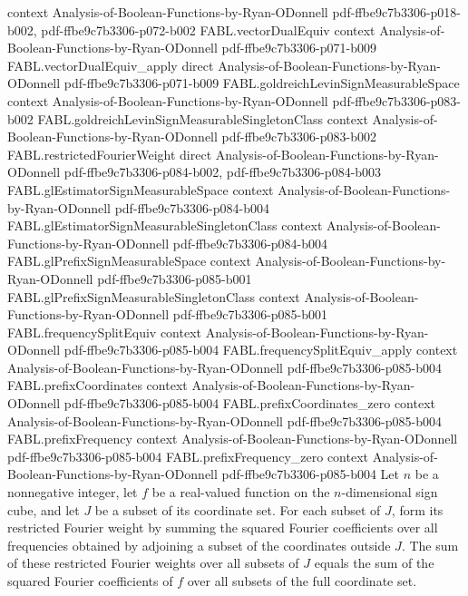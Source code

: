 \begin{theorem}
  {context}
  {Analysis-of-Boolean-Functions-by-Ryan-ODonnell}
  {pdf-ffbe9c7b3306-p018-b002,
    pdf-ffbe9c7b3306-p072-b002}
\proofstep
  {FABL.vectorDualEquiv}
  {context}
  {Analysis-of-Boolean-Functions-by-Ryan-ODonnell}
  {pdf-ffbe9c7b3306-p071-b009}
\proofstep
  {FABL.vectorDualEquiv_apply}
  {direct}
  {Analysis-of-Boolean-Functions-by-Ryan-ODonnell}
  {pdf-ffbe9c7b3306-p071-b009}
\proofstep
  {FABL.goldreichLevinSignMeasurableSpace}
  {context}
  {Analysis-of-Boolean-Functions-by-Ryan-ODonnell}
  {pdf-ffbe9c7b3306-p083-b002}
\proofstep
  {FABL.goldreichLevinSignMeasurableSingletonClass}
  {context}
  {Analysis-of-Boolean-Functions-by-Ryan-ODonnell}
  {pdf-ffbe9c7b3306-p083-b002}
\proofstep
  {FABL.restrictedFourierWeight}
  {direct}
  {Analysis-of-Boolean-Functions-by-Ryan-ODonnell}
  {pdf-ffbe9c7b3306-p084-b002,
    pdf-ffbe9c7b3306-p084-b003}
\proofstep
  {FABL.glEstimatorSignMeasurableSpace}
  {context}
  {Analysis-of-Boolean-Functions-by-Ryan-ODonnell}
  {pdf-ffbe9c7b3306-p084-b004}
\proofstep
  {FABL.glEstimatorSignMeasurableSingletonClass}
  {context}
  {Analysis-of-Boolean-Functions-by-Ryan-ODonnell}
  {pdf-ffbe9c7b3306-p084-b004}
\proofstep
  {FABL.glPrefixSignMeasurableSpace}
  {context}
  {Analysis-of-Boolean-Functions-by-Ryan-ODonnell}
  {pdf-ffbe9c7b3306-p085-b001}
\proofstep
  {FABL.glPrefixSignMeasurableSingletonClass}
  {context}
  {Analysis-of-Boolean-Functions-by-Ryan-ODonnell}
  {pdf-ffbe9c7b3306-p085-b001}
\proofstep
  {FABL.frequencySplitEquiv}
  {context}
  {Analysis-of-Boolean-Functions-by-Ryan-ODonnell}
  {pdf-ffbe9c7b3306-p085-b004}
\proofstep
  {FABL.frequencySplitEquiv_apply}
  {context}
  {Analysis-of-Boolean-Functions-by-Ryan-ODonnell}
  {pdf-ffbe9c7b3306-p085-b004}
\proofstep
  {FABL.prefixCoordinates}
  {context}
  {Analysis-of-Boolean-Functions-by-Ryan-ODonnell}
  {pdf-ffbe9c7b3306-p085-b004}
\proofstep
  {FABL.prefixCoordinates_zero}
  {context}
  {Analysis-of-Boolean-Functions-by-Ryan-ODonnell}
  {pdf-ffbe9c7b3306-p085-b004}
\proofstep
  {FABL.prefixFrequency}
  {context}
  {Analysis-of-Boolean-Functions-by-Ryan-ODonnell}
  {pdf-ffbe9c7b3306-p085-b004}
\proofstep
  {FABL.prefixFrequency_zero}
  {context}
  {Analysis-of-Boolean-Functions-by-Ryan-ODonnell}
  {pdf-ffbe9c7b3306-p085-b004}
Let $n$ be a nonnegative integer, let $f$ be a real-valued function on the
$n$-dimensional sign cube, and let $J$ be a subset of its coordinate set. For each
subset of $J$, form its restricted Fourier weight by summing the squared Fourier
coefficients over all frequencies obtained by adjoining a subset of the coordinates
outside $J$. The sum of these restricted Fourier weights over all subsets of $J$ equals
the sum of the squared Fourier coefficients of $f$ over all subsets of the full
coordinate set.
\end{theorem}

